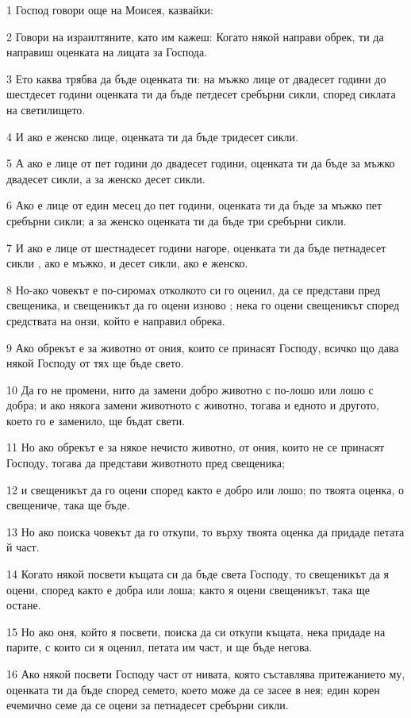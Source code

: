 \par 1 Господ говори още на Моисея, казвайки:
\par 2 Говори на израилтяните, като им кажеш: Когато някой направи обрек, ти да направиш оценката на лицата за Господа.
\par 3 Ето каква трябва да бъде оценката ти: на мъжко лице от двадесет години до шестдесет години оценката ти да бъде петдесет сребърни сикли, според сиклата на светилището.
\par 4 И ако е женско лице, оценката ти да бъде тридесет сикли.
\par 5 А ако е лице от пет години до двадесет години, оценката ти да бъде за мъжко двадесет сикли, а за женско десет сикли.
\par 6 Ако е лице от един месец до пет години, оценката ти да бъде за мъжко пет сребърни сикли; а за женско оценката ти да бъде три сребърни сикли.
\par 7 И ако е лице от шестнадесет години нагоре, оценката ти да бъде петнадесет сикли , ако е мъжко, и десет сикли, ако е женско.
\par 8 Но-ако човекът е по-сиромах отколкото си го оценил, да се представи пред свещеника, и свещеникът да го оцени изново ; нека го оцени свещеникът според средствата на онзи, който е направил обрека.
\par 9 Ако обрекът е за животно от ония, които се принасят Господу, всичко що дава някой Господу от тях ще бъде свето.
\par 10 Да го не промени, нито да замени добро животно с по-лошо или лошо с добра; и ако някога замени животното с животно, тогава и едното и другото, което го е заменило, ще бъдат свети.
\par 11 Но ако обрекът е за някое нечисто животно, от ония, които не се принасят Господу, тогава да представи животното пред свещеника;
\par 12 и свещеникът да го оцени според както е добро или лошо; по твоята оценка, о свещениче, така ще бъде.
\par 13 Но ако поиска човекът да го откупи, то върху твоята оценка да придаде петата й част.
\par 14 Когато някой посвети къщата си да бъде света Господу, то свещеникът да я оцени, според както е добра или лоша; както я оцени свещеникът, така ще остане.
\par 15 Но ако оня, който я посвети, поиска да си откупи къщата, нека придаде на парите, с които си я оценил, петата им част, и ще бъде негова.
\par 16 Ако някой посвети Господу част от нивата, която съставлява притежанието му, оценката ти да бъде според семето, което може да се засее в нея; един корен ечемично семе да се оцени за петнадесет сребърни сикли.
